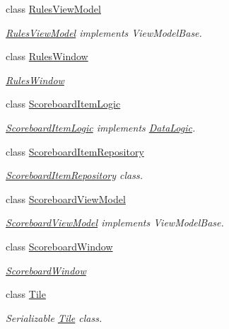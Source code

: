 \begin{DoxyCompactItemize}
class \mbox{\hyperlink{class_game_1_1_rules_view_model}{Rules\+View\+Model}}
\begin{DoxyCompactList}\small\item\em \mbox{\hyperlink{class_game_1_1_rules_view_model}{Rules\+View\+Model}} implements View\+Model\+Base. \end{DoxyCompactList}\item 
class \mbox{\hyperlink{class_game_1_1_rules_window}{Rules\+Window}}
\begin{DoxyCompactList}\small\item\em \mbox{\hyperlink{class_game_1_1_rules_window}{Rules\+Window}} \end{DoxyCompactList}\item 
class \mbox{\hyperlink{class_game_1_1_scoreboard_item_logic}{Scoreboard\+Item\+Logic}}
\begin{DoxyCompactList}\small\item\em \mbox{\hyperlink{class_game_1_1_scoreboard_item_logic}{Scoreboard\+Item\+Logic}} implements \mbox{\hyperlink{class_game_1_1_data_logic}{Data\+Logic}}. \end{DoxyCompactList}\item 
class \mbox{\hyperlink{class_game_1_1_scoreboard_item_repository}{Scoreboard\+Item\+Repository}}
\begin{DoxyCompactList}\small\item\em \mbox{\hyperlink{class_game_1_1_scoreboard_item_repository}{Scoreboard\+Item\+Repository}} class. \end{DoxyCompactList}\item 
class \mbox{\hyperlink{class_game_1_1_scoreboard_view_model}{Scoreboard\+View\+Model}}
\begin{DoxyCompactList}\small\item\em \mbox{\hyperlink{class_game_1_1_scoreboard_view_model}{Scoreboard\+View\+Model}} implements View\+Model\+Base. \end{DoxyCompactList}\item 
class \mbox{\hyperlink{class_game_1_1_scoreboard_window}{Scoreboard\+Window}}
\begin{DoxyCompactList}\small\item\em \mbox{\hyperlink{class_game_1_1_scoreboard_window}{Scoreboard\+Window}} \end{DoxyCompactList}\item 
class \mbox{\hyperlink{class_game_1_1_tile}{Tile}}
\begin{DoxyCompactList}\small\item\em Serializable \mbox{\hyperlink{class_game_1_1_tile}{Tile}} class. \end{DoxyCompactList}\end{DoxyCompactItemize}
